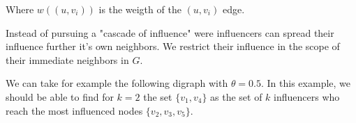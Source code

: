 \documentclass[letter,10pt]{article}
\theoremstyle{definition}
\begin{document}
Where $w((u,v_i))$ is the weigth of the $(u, v_i)$ edge.


Instead of pursuing a "cascade of influence" were influencers can spread their influence further it's own neighbors. We restrict their influence in the scope of their immediate neighbors in $G$. 

We can take for example the following digraph with $\theta = 0.5$. In this example, we should be able to find  for $k=2$ the set $\{v_1, v_4\}$ as the set of $k$ influencers who reach the most influenced nodes $\{v_2, v_3, v_5\}$. 


\begin{center}

\begin{tikzpicture}[x=0.75pt,y=0.75pt,yscale=-1,xscale=1]


\end{tikzpicture}
\end{center}
\end{document}
